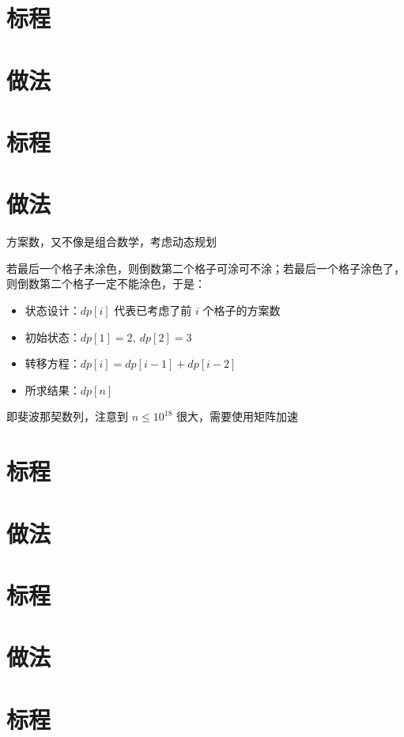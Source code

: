 \documentclass[fontset=ubuntu]{ctsol}
\begin{document}
\section*{标程}


\makesolution
\section*{做法}

\section*{标程}


\makesolution
\section*{做法}

方案数，又不像是组合数学，考虑动态规划

若最后一个格子未涂色，则倒数第二个格子可涂可不涂；若最后一个格子涂色了，则倒数第二个格子一定不能涂色，于是：

\begin{itemize}
    \item 状态设计：$dp[i]$ 代表已考虑了前 $i$ 个格子的方案数
    \item 初始状态：$dp[1] = 2,~dp[2] = 3$
    \item 转移方程：$dp[i] = dp[i-1] + dp[i-2]$
    \item 所求结果：$dp[n]$
\end{itemize}

即斐波那契数列，注意到 $n \leq {10}^{18}$ 很大，需要使用矩阵加速

\section*{标程}


\makesolution
\section*{做法}

\section*{标程}


\makesolution
\section*{做法}

\section*{标程}

\end{document}
